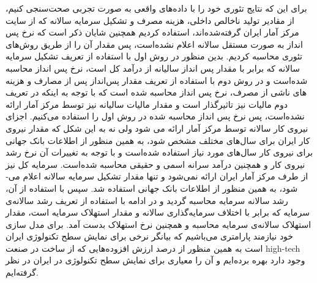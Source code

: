 \documentclass[11pt, fleqn]{article}
\begin{document}
\begin{multicols}{2}





















	برای این که نتایج تئوری خود را با داده‌های واقعی به صورت تجربی صحت‌سنجی کنیم،‌ از 
مقادیر تولید ناخالص داخلی، هزینه مصرف و تشکیل سرمایه سالانه که از سایت مرکز آمار ایران 
\cite{s2}
گرفته‌شده‌اند، استفاده کردیم همچنین شایان ذکر است که نرخ پس­‌انداز به صورت مستقل سالانه اعلام نشده‌است، پس مقدار آن را از طریق روش­‌های تئوری محاسبه کردیم. بدین منظور در روش اول با استفاده از تعریف تشکیل سرمایه سالانه که برابر با مقدار پس انداز سالیانه از درآمد کل است، نرخ پس انداز محاسبه شده‌است و در روش دوم با استفاده از تعریف مقدار پس‌‌انداز پس از مصارف و هزینه­‌های ناشی از مصرف، نرخ پس انداز محاسبه شده است که با توجه به اینکه در تعریف دوم مالیات نیز تاثیرگذار است و مقدار مالیات­ سالیانه نیز توسط مرکز آمار ارائه نشده‌است، پس نرخ پس انداز محاسبه شده در روش اول را استفاده می­‌کنیم. اجزای نیروی کار سالانه توسط مرکز آمار ارائه می ­شود ولی نه به این شکل که مقدار نیروی کار ایران برای سال­‌های مختلف مشخص شود، به همین منظور از اطلاعات بانک جهانی
 \cite{s3}
 برای نیروی کار سال­‌های مورد نیاز استفاده شده‌است و با توجه به تغییرات آن نرخ رشد نیروی کار و همچنین درآمد سرانه اسمی  و حقیقی محاسبه شده‌است. سرمایه کل نیز از طرف مرکز آمار ایران ارائه نمی‌­شود و تنها مقدار تشکیل سرمایه سالانه اعلام می­ شود، به همین منظور از اطلاعات بانک جهانی استفاده شد. سپس با استفاده از آن، رشد سالانه سرمایه محاسبه گردید و در ادامه با استفاده از تعریف رشد سالانه‌ی سرمایه که برابر با اختلاف سرمایه‌گذاری سالانه و مقدار استهلاک سرمایه است، مقدار استهلاک سالانه‌ی سرمایه محاسبه و همچنین نرخ استهلاک بدست آمد. برای مدل سازی خود نیازمند پارامتری می­‌باشیم که بیانگر نرخی برای نمایش سطح تکنولوژی ایران است به همین منظور از درصد ارزش افزوده‌ه­ایی که از ساخت در صنعت high-tech وجود دارد بهره برده‌­ایم و آن را معیاری برای نمایش سطح تکنولوژی در ایران در نظر گرفته‌­ایم.
	

\end{multicols}
\end{document}
